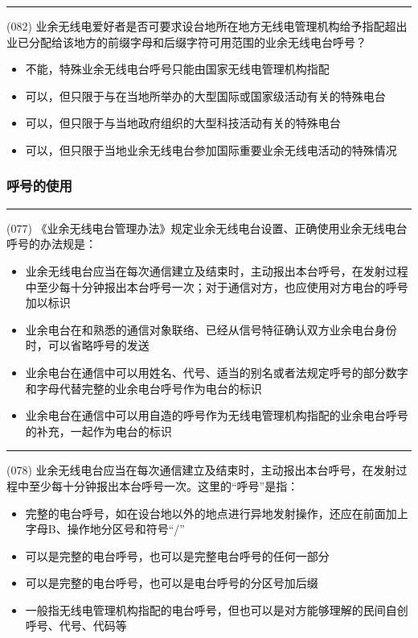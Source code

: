 \documentclass[twocolumn,hyperref,UTF8]{ctexart}  %
\begin{document}
\noindent\rule{0.5\textwidth}{1pt}
\heiti (082) 业余无线电爱好者是否可要求设台地所在地方无线电管理机构给予指配超出业已分配给该地方的前缀字母和后缀字符可用范围的业余无线电台呼号？ \songti {\color{gray} [LK0083] }
\begin{itemize}
	\item  不能，特殊业余无线电台呼号只能由国家无线电管理机构指配
	\item  可以，但只限于与在当地所举办的大型国际或国家级活动有关的特殊电台
	\item  可以，但只限于与当地政府组织的大型科技活动有关的特殊电台
	\item  可以，但只限于当地业余无线电台参加国际重要业余无线电活动的特殊情况
\end{itemize}


\subsubsection{呼号的使用}


\noindent\rule{0.5\textwidth}{1pt}
\heiti (077) 《业余无线电台管理办法》规定业余无线电台设置、正确使用业余无线电台呼号的办法规是： \songti {\color{gray} [LK0077] }
\begin{itemize}
	\item  业余无线电台应当在每次通信建立及结束时，主动报出本台呼号，在发射过程中至少每十分钟报出本台呼号一次；对于通信对方，也应使用对方电台的呼号加以标识
	\item  业余电台在和熟悉的通信对象联络、已经从信号特征确认双方业余电台身份时，可以省略呼号的发送
	\item  业余电台在通信中可以用姓名、代号、适当的别名或者法规定呼号的部分数字和字母代替完整的业余电台呼号作为电台的标识
	\item  业余电台在通信中可以用自造的呼号作为无线电管理机构指配的业余电台呼号的补充，一起作为电台的标识
\end{itemize}


\noindent\rule{0.5\textwidth}{1pt}
\heiti (078) 业余无线电台应当在每次通信建立及结束时，主动报出本台呼号，在发射过程中至少每十分钟报出本台呼号一次。这里的“呼号”是指： \songti {\color{gray} [LK0078] }
\begin{itemize}
	\item  完整的电台呼号，如在设台地以外的地点进行异地发射操作，还应在前面加上字母B、操作地分区号和符号“/”
	\item  可以是完整的电台呼号，也可以是完整电台呼号的任何一部分
	\item  可以是完整的电台呼号，也可以是电台呼号的分区号加后缀
	\item  一般指无线电管理机构指配的电台呼号，但也可以是对方能够理解的民间自创呼号、代号、代码等
\end{itemize}
\end{document}
